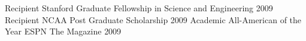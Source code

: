
\begin{cvhonors}
  \cvhonor%
    {Recipient}
    {Stanford Graduate Fellowship in Science and Engineering}
    {}
    {2009}
  \cvhonor%
    {Recipient}
    {NCAA Post Graduate Scholarship}
    {}
    {2009}
  \cvhonor%
    {Academic All-American of the Year}
    {ESPN The Magazine}
    {}
    {2009}
\end{cvhonors}
